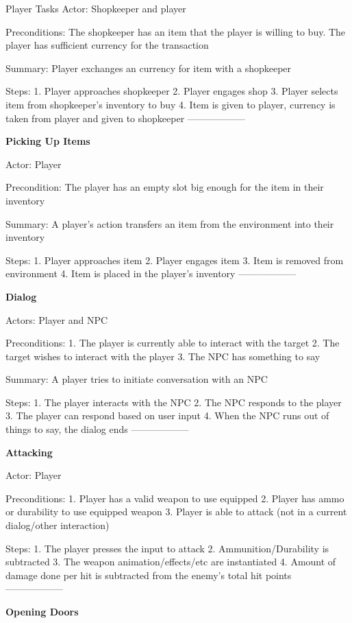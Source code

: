 \documentclass[12pt]{report}
\begin{document}
\begin {section}{Player Tasks}
Actor: Shopkeeper and player

Preconditions: The shopkeeper has an item that the player is willing to buy. The player has sufficient
currency for the transaction

Summary: Player exchanges an currency for item with a shopkeeper

Steps: 
1. Player approaches shopkeeper
2. Player engages shop
3. Player selects item from shopkeeper's inventory to buy
4. Item is given to player, currency is taken from player and given to shopkeeper
------------------

\textbf{Picking Up Items} %

Actor: Player

Precondition: The player has an empty slot big enough for the item in their inventory

Summary: A player's action transfers an item from the environment into their inventory

Steps:
1. Player approaches item
2. Player engages item
3. Item is removed from environment
4. Item is placed in the player's  inventory
------------------

\textbf{Dialog} %

Actors: Player and NPC

Preconditions:
1. The player is currently able to interact with the target
2. The target wishes to interact with the player
3. The NPC has something to say

Summary: A player tries to initiate conversation with an NPC

Steps:
1. The player interacts with the NPC
2. The NPC responds to the player
3. The player can respond based on user input
4. When the NPC runs out of things to say, the dialog ends
------------------

\textbf{Attacking} %

Actor: Player

Preconditions:
1. Player has a valid weapon to use equipped
2. Player has ammo or durability to use equipped weapon
3. Player is able to attack (not in a current dialog/other interaction)

Steps:
1. The player presses the input to attack
2. Ammunition/Durability is subtracted
3. The weapon animation/effects/etc are instantiated
4. Amount of damage done per hit is subtracted from the enemy's total hit points
------------------

\textbf{Opening Doors} %


\end{section}
\end{document}
